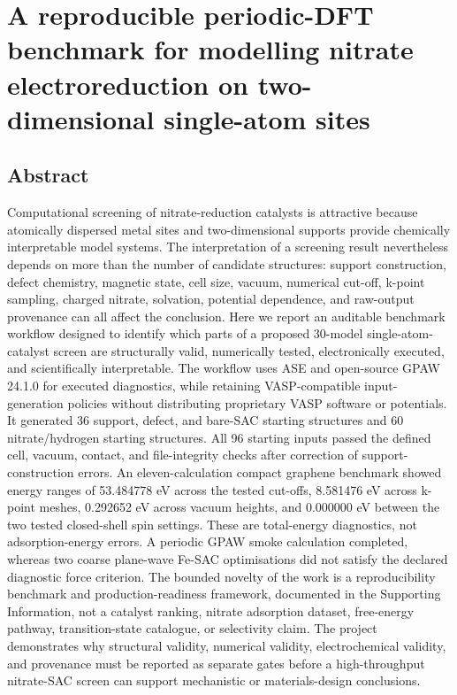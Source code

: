 \documentclass[
]{article}
\author{}
\date{}
\begin{document}
\hypertarget{a-reproducible-periodic-dft-benchmark-for-modelling-nitrate-electroreduction-on-two-dimensional-single-atom-sites}{%
\section{A reproducible periodic-DFT benchmark for modelling nitrate
electroreduction on two-dimensional single-atom
sites}\label{a-reproducible-periodic-dft-benchmark-for-modelling-nitrate-electroreduction-on-two-dimensional-single-atom-sites}}

\hypertarget{abstract}{%
\subsection{Abstract}\label{abstract}}

Computational screening of nitrate-reduction catalysts is attractive
because atomically dispersed metal sites and two-dimensional supports
provide chemically interpretable model systems. The interpretation of a
screening result nevertheless depends on more than the number of
candidate structures: support construction, defect chemistry, magnetic
state, cell size, vacuum, numerical cut-off, k-point sampling, charged
nitrate, solvation, potential dependence, and raw-output provenance can
all affect the conclusion. Here we report an auditable benchmark
workflow designed to identify which parts of a proposed 30-model
single-atom-catalyst screen are structurally valid, numerically tested,
electronically executed, and scientifically interpretable. The workflow
uses ASE and open-source GPAW 24.1.0 for executed diagnostics, while
retaining VASP-compatible input-generation policies without distributing
proprietary VASP software or potentials. It generated 36 support,
defect, and bare-SAC starting structures and 60 nitrate/hydrogen
starting structures. All 96 starting inputs passed the defined cell,
vacuum, contact, and file-integrity checks after correction of
support-construction errors. An eleven-calculation compact graphene
benchmark showed energy ranges of 53.484778 eV across the tested
cut-offs, 8.581476 eV across k-point meshes, 0.292652 eV across vacuum
heights, and 0.000000 eV between the two tested closed-shell spin
settings. These are total-energy diagnostics, not adsorption-energy
errors. A periodic GPAW smoke calculation completed, whereas two coarse
plane-wave Fe-SAC optimisations did not satisfy the declared diagnostic
force criterion. The bounded novelty of the work is a reproducibility
benchmark and production-readiness framework, documented in the
Supporting Information, not a catalyst ranking, nitrate adsorption
dataset, free-energy pathway, transition-state catalogue, or selectivity
claim. The project demonstrates why structural validity, numerical
validity, electrochemical validity, and provenance must be reported as
separate gates before a high-throughput nitrate-SAC screen can support
mechanistic or materials-design conclusions.
\end{document}
